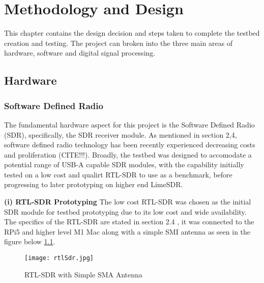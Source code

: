 \chapter{Methodology and Design \label{sec:methodology}}

This chapter contains the design decision and steps taken to complete the testbed creation and testing. The project can broken into the three main areas of hardware, software and digital signal processing. 

\section{Hardware \label{sec:hardware}}

\subsection{Software Defined Radio \label{sec: SDRdongle}}
The fundamental hardware aspect for this project is the Software Defined Radio (SDR), specifically, the SDR receiver module.  As mentioned in section 2,4, software defined radio technology has been recently experienced decreasing costs and proliferation (CITE!!!). Broadly, the testbed was designed to accomodate a potential range of USB-A capable SDR modules, with the capability initially tested on a low cost and qualirt RTL-SDR to use as a benchmark, before progressing to later prototyping on higher end LimeSDR.

\vspace{0.5cm} \noindent 
\textbf{(i) RTL-SDR Prototyping}
The low cost RTL-SDR was chosen as the initial SDR module for testbed prototyping  due to its low cost and wide availability. The specifics of the RTL-SDR are stated in section 2.4 , it was connected to the RPi5 and higher level M1 Mac along with a simple SMI antenna as seen in the figure below \ref*{fig:rtlSDR}. 

\begin{figure}[htbp]
    \centering
    \texttt{[image: rtlSdr.jpg]}
    \caption{RTL-SDR with Simple SMA Antenna}
    \label{fig:rtlSDR}
\end{figure}

